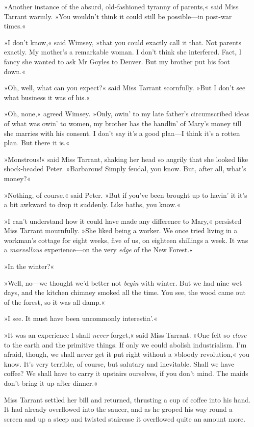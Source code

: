 »Another instance of the absurd, old-fashioned tyranny of parents,« said Miss Tarrant warmly. »You wouldn't think it could still be possible—in post-war times.«

»I don't know,« said Wimsey, »that you could exactly call it that. Not parents exactly. My mother's a remarkable woman. I don't think she interfered. Fact, I fancy she wanted to ask Mr Goyles to Denver. But my brother put his foot down.«

»Oh, well, what can you expect?« said Miss Tarrant scornfully. »But I don't see what business it was of his.«

»Oh, none,« agreed Wimsey. »Only, owin' to my late father's circumscribed ideas of what was owin' to women, my brother has the handlin' of Mary's money till she marries with his consent. I don't say it's a good plan—I think it's a rotten plan. But there it is.«

»Monstrous!« said Miss Tarrant, shaking her head so angrily that she looked like shock-headed Peter. »Barbarous! Simply feudal, you know.  But, after all, what's money?«

»Nothing, of course,« said Peter. »But if you've been brought up to havin' it it's a bit awkward to drop it suddenly. Like baths, you know.«

»I can't understand how it could have made any difference to Mary,« persisted Miss Tarrant mournfully. »She liked being a worker. We once tried living in a workman's cottage for eight weeks, five of us, on eighteen shillings a week. It was a \textit{marvellous} experience—on the very \textit{edge} of the New Forest.«

»In the winter?«

»Well, no—we thought we'd better not \textit{begin} with winter. But we had nine wet days, and the kitchen chimney smoked all the time. You see, the wood came out of the forest, so it was all damp.«

»I see. It must have been uncommonly interestin'.«

»It was an experience I shall \textit{never} forget,« said Miss Tarrant. »One felt so \textit{close} to the earth and the primitive things. If only we could abolish industrialism. I'm afraid, though, we shall never get it put right without a »bloody revolution,« you know. It's very terrible, of course, but salutary and inevitable. Shall we have coffee? We shall have to carry it upstairs ourselves, if you don't mind. The maids don't bring it up after dinner.«

Miss Tarrant settled her bill and returned, thrusting a cup of coffee into his hand. It had already overflowed into the saucer, and as he groped his way round a screen and up a steep and twisted staircase it overflowed quite an amount more.

